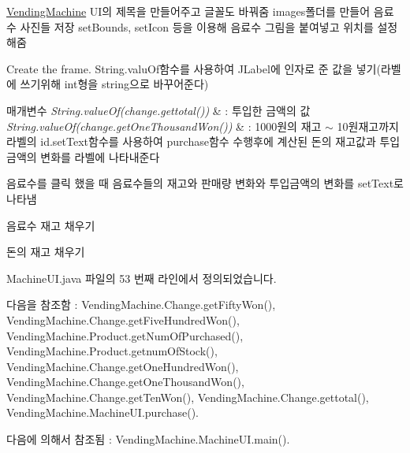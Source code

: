 \hyperlink{namespace_vending_machine}{Vending\+Machine} U\+I의 제목을 만들어주고 글꼴도 바꿔줌 images폴더를 만들어 음료수 사진들 저장 set\+Bounds, set\+Icon 등을 이용해 음료수 그림을 붙여넣고 위치를 설정해줌 

Create the frame. String.\+valu\+Of함수를 사용하여 J\+Label에 인자로 준 값을 넣기(라벨에 쓰기위해 int형을 string으로 바꾸어준다) 
\begin{DoxyParams}{매개변수}
{\em String.\+value\+Of(change.\+gettotal())} & \+: 투입한 금액의 값 \\
\hline
{\em String.\+value\+Of(change.\+get\+One\+Thousand\+Won())} & \+: 1000원의 재고 $\sim$ 10원재고까지 라벨의 id.\+set\+Text함수를 사용하여 purchase함수 수행후에 계산된 돈의 재고값과 투입금액의 변화를 라벨에 나타내준다\\
\hline
\end{DoxyParams}
음료수를 클릭 했을 때 음료수들의 재고와 판매량 변화와 투입금액의 변화를 set\+Text로 나타냄

음료수 재고 채우기

돈의 재고 채우기

Machine\+U\+I.\+java 파일의 53 번째 라인에서 정의되었습니다.



다음을 참조함 \+:  Vending\+Machine.\+Change.\+get\+Fifty\+Won(), Vending\+Machine.\+Change.\+get\+Five\+Hundred\+Won(), Vending\+Machine.\+Product.\+get\+Num\+Of\+Purchased(), Vending\+Machine.\+Product.\+getnum\+Of\+Stock(), Vending\+Machine.\+Change.\+get\+One\+Hundred\+Won(), Vending\+Machine.\+Change.\+get\+One\+Thousand\+Won(), Vending\+Machine.\+Change.\+get\+Ten\+Won(), Vending\+Machine.\+Change.\+gettotal(), Vending\+Machine.\+Machine\+U\+I.\+purchase().



다음에 의해서 참조됨 \+:  Vending\+Machine.\+Machine\+U\+I.\+main().


